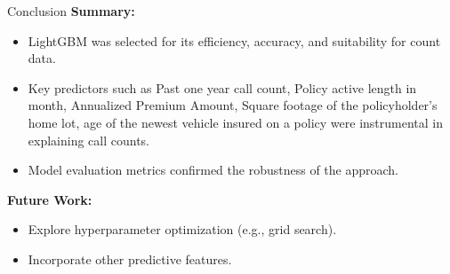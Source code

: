 \documentclass{beamer}\usepackage[]{graphicx}\usepackage[]{xcolor}
\begin{document}
\begin{frame}{Conclusion}
\textbf{Summary:}
\begin{itemize}
    \item LightGBM was selected for its efficiency, accuracy, and suitability for count data.
    \item Key predictors such as Past one year call count, Policy active length in month, Annualized Premium Amount, Square footage of the policyholder’s home lot, age of the newest vehicle insured on a policy were instrumental in explaining call counts.
    \item Model evaluation metrics confirmed the robustness of the approach.
\end{itemize}

\textbf{Future Work:}
\begin{itemize}
    \item Explore hyperparameter optimization (e.g., grid search).
    \item Incorporate other predictive features.
\end{itemize}
\end{frame}
\end{document}
